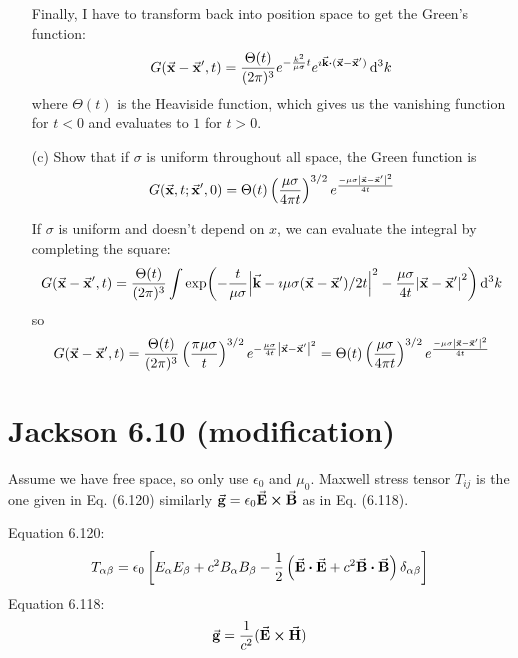 \documentclass[a4paper,twoside]{article}
\begin{document}
\begin{itemize}
\begin{problem}
            Finally, I have to transform back into position space to get the Green's function:
            \begin{equation}
                G( \va{x} - \va{x}', t) = \frac{\Theta(t)}{(2 \pi)^3} e^{- \frac{k^2}{\mu \sigma} t} e^{\imath \va{k} \vdot (\va{x} - \va{x}')} \dd[3]{k}
            \end{equation}
            where $ \Theta(t) $ is the Heaviside function, which gives us the vanishing function for $ t < 0 $ and evaluates to $ 1 $ for $ t > 0 $.
        \end{problem}
    \item[(c)] Show that if $ \sigma $ is uniform throughout all space, the Green function is
        \begin{equation}
            G( \va{x},t; \va{x}', 0) = \Theta(t) \left( \frac{\mu \sigma}{4 \pi t} \right)^{3/2} e^{\frac{- \mu \sigma \abs{\va{x}-\va{x}'}^2}{4t}}
        \end{equation}
        \begin{problem}
            If $\sigma$ is uniform and doesn't depend on $ x $, we can evaluate the integral by completing the square:
            \begin{equation}
                G( \va{x} - \va{x}', t) = \frac{\Theta(t)}{(2 \pi)^3} \int \exp(-\frac{t}{\mu \sigma} \abs{ \va{k} - \imath \mu \sigma( \va{x} - \va{x}')/2t}^2 - \frac{\mu \sigma}{4t} \abs{\va{x}-\va{x}'}^2) \dd[3]{k}
            \end{equation}
            so
            \begin{equation}
                G( \va{x} - \va{x}',t) = \frac{\Theta(t)}{(2 \pi)^3} \left( \frac{\pi \mu \sigma}{t} \right)^{3/2} e^{- \frac{\mu \sigma}{4t} \abs{\va{x}-\va{x}'}^2} = \Theta(t) \left( \frac{\mu \sigma}{4 \pi t} \right)^{3/2} e^{\frac{- \mu \sigma \abs{\va{x}-\va{x}'}^2}{4t}}
            \end{equation}
        \end{problem}
\end{itemize}

\section{Jackson 6.10 (modification)}
Assume we have free space, so only use $ \epsilon_0 $ and $ \mu_0 $. Maxwell stress tensor $ T_{ij} $ is the one given in Eq. (6.120) similarly $ \va{g} = \epsilon_0 \va{E} \cross \va{B} $ as in Eq. (6.118).

Equation 6.120:
\begin{equation}
    T_{\alpha \beta} = \epsilon_0 \left[ E_{\alpha} E_{\beta} + c^2 B_{\alpha} B_{\beta} - \frac{1}{2} \left( \va{E} \vdot \va{E} + c^2 \va{B} \vdot \va{B} \right) \delta_{\alpha \beta} \right]
\end{equation}
Equation 6.118:
\begin{equation}
    \va{g} = \frac{1}{c^2} (\va{E} \cross \va{H})
\end{equation}
\end{document}
